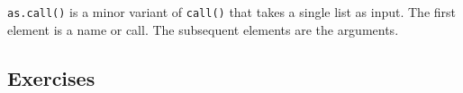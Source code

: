 \texttt{as.call()} is a minor variant of \texttt{call()} that takes a
single list as input. The first element is a name or call. The
subsequent elements are the arguments.

\begin{Shaded}
\begin{Highlighting}[]
\NormalTok{(}\NormalTok{(}\NormalTok{(}\NormalTok{:}\NormalTok{)))}
\NormalTok{(}\NormalTok{(}\NormalTok{(}\NormalTok{(}\NormalTok{)), }\NormalTok{))}
\end{Highlighting}
\end{Shaded}

\subsection{Exercises}

